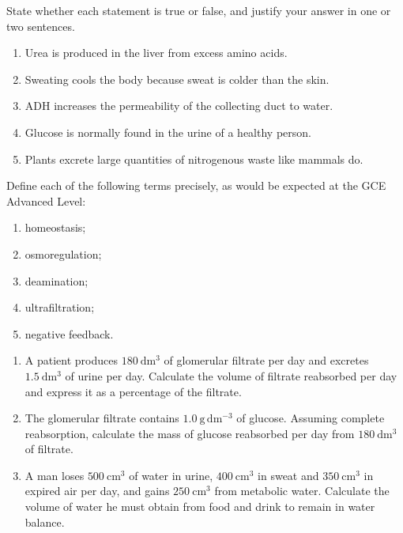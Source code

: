 \documentclass[11pt]{article}
\begin{document}
\begin{exercice}
State whether each statement is true or false, and justify your answer in one or two sentences.
\begin{enumerate}
\item Urea is produced in the liver from excess amino acids.
\item Sweating cools the body because sweat is colder than the skin.
\item ADH increases the permeability of the collecting duct to water.
\item Glucose is normally found in the urine of a healthy person.
\item Plants excrete large quantities of nitrogenous waste like mammals do.
\end{enumerate}
\end{exercice}

\begin{exercice}
Define each of the following terms precisely, as would be expected at the GCE Advanced Level:
\begin{enumerate}
\item homeostasis;
\item osmoregulation;
\item deamination;
\item ultrafiltration;
\item negative feedback.
\end{enumerate}
\end{exercice}

\begin{exercice}
\begin{enumerate}
\item A patient produces $180\ \mathrm{dm^3}$ of glomerular filtrate per day and excretes $1.5\ \mathrm{dm^3}$ of urine per day. Calculate the volume of filtrate reabsorbed per day and express it as a percentage of the filtrate.
\item The glomerular filtrate contains $1.0\ \mathrm{g\,dm^{-3}}$ of glucose. Assuming complete reabsorption, calculate the mass of glucose reabsorbed per day from $180\ \mathrm{dm^3}$ of filtrate.
\item A man loses $500\ \mathrm{cm^3}$ of water in urine, $400\ \mathrm{cm^3}$ in sweat and $350\ \mathrm{cm^3}$ in expired air per day, and gains $250\ \mathrm{cm^3}$ from metabolic water. Calculate the volume of water he must obtain from food and drink to remain in water balance.
\end{enumerate}
\end{exercice}
\end{document}
